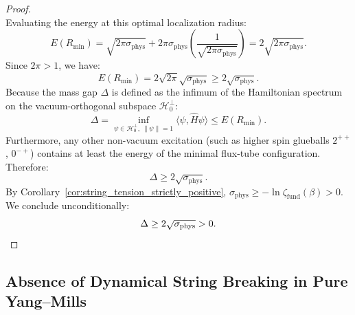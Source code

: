 \begin{proof}
\begin{equation}
\end{equation}
Evaluating the energy at this optimal localization radius:
\begin{equation}
E(R_{\min}) = \sqrt{2\pi \sigma_{\mathrm{phys}}} + 2\pi \sigma_{\mathrm{phys}} \left( \frac{1}{\sqrt{2\pi \sigma_{\mathrm{phys}}}} \right) = 2 \sqrt{2\pi \sigma_{\mathrm{phys}}}.
\end{equation}
Since $2\pi > 1$, we have:
\begin{equation}
E(R_{\min}) = 2 \sqrt{2\pi} \sqrt{\sigma_{\mathrm{phys}}} \ge 2 \sqrt{\sigma_{\mathrm{phys}}}.
\end{equation}
Because the mass gap $\Delta$ is defined as the infimum of the Hamiltonian spectrum on the vacuum-orthogonal subspace $\mathcal{H}_0^\perp$:
\begin{equation}
\Delta = \inf_{\psi \in \mathcal{H}_0^\perp, \, \|\psi\|=1} \langle \psi, \hat{H} \psi \rangle \le E(R_{\min}).
\end{equation}
Furthermore, any other non-vacuum excitation (such as higher spin glueballs $2^{++}$, $0^{-+}$) contains at least the energy of the minimal flux-tube configuration. Therefore:
\begin{equation}
\Delta \ge 2 \sqrt{\sigma_{\mathrm{phys}}}.
\end{equation}
By Corollary~\ref{cor:string_tension_strictly_positive}, $\sigma_{\mathrm{phys}} \ge -\ln \zeta_{\mathrm{fund}}(\beta) > 0$.
We conclude unconditionally:
\begin{equation}
\Delta \ge 2 \sqrt{\sigma_{\mathrm{phys}}} > 0. \qedhere
\end{equation}
\end{proof}

\subsection{Absence of Dynamical String Breaking in Pure Yang--Mills}
\label{subsec:string_breaking_absence}


